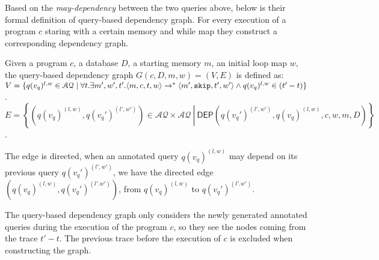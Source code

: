 %
Based on the \emph{may-dependency} between the two queries above,
below is their formal definition of query-based dependency graph. 
For every execution of a program $c$ staring with a certain memory and while map
they construct a corresponding dependency graph.  
\begin{defn}
Given a program $c$, a database $D$, a starting memory $m$, an initial loop map $w$, the query-based dependency graph $G(c,D,m,w) = (V, E)$ is defined as: \\
$V =\{q({v_q})^{l,w} \in \mathcal{AQ} \mid \forall t. \exists m',  w', t'.  \langle m ,c, t, w \rangle  \to^{*}  \langle m' , \mathtt{skip}, t', w'  \rangle  \land q({v_q})^{l,w} \in {(t'-t)}  \}$.
\\
$E = \left\{(q({v_q})^{(l,w)},q({v_q}')^{(l',w')}) \in \mathcal{AQ} \times \mathcal{AQ} 
~ \left \vert ~ \mathsf{DEP}(q({v_q}')^{(l',w')},q({v_q})^{(l,w)}, c,w,m,D)
 \right.\right\}$.
\end{defn}
%
The edge is directed, when an annotated query $q({v_q})^{(l,w)}$ may depend on its previous query $q({v_q}')^{(l',w')}$, we have the directed
edge $(q({v_q})^{(l,w)}, q({v_q}')^{(l'.w')})$, from $q({v_q})^{(l,w)} $ to $q({v_q}')^{(l'.w')}$.

The query-based dependency graph only considers the newly generated annotated queries during the execution of the program $c$,
so they see the nodes coming from the trace $t'-t$.
The previous trace before the execution of $c$ is excluded when constructing the graph.

